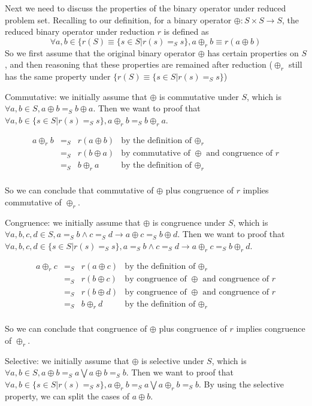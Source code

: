 \documentclass[a4paper,12pt,twoside,openright]{report}
\newcommand{\e}[2]{
\begin{equation}
  \label{#1} 
  #2
\end{equation}
}
\begin{document}
Next we need to discuss the properties of the binary operator under reduced problem set. 
Recalling to our definition, for a binary operator $\oplus : S \times S \rightarrow S$, the reduced binary operator under reduction $r$ is defined as \[\forall a, b \in \{r(S) \equiv \{s \in S | r(s) =_S s\}, a \oplus_r b \equiv r(a \oplus b)\]
So we first assume that the original binary operator $\oplus$ has certain properties on $S$, and then reasoning that these properties are remained after reduction ($\oplus_r$ still has the same property under $\{r(S) \equiv \{s \in S | r(s) =_S s\}$)

Commutative: we initially assume that $\oplus$ is commutative under $S$, which is $\forall a,b \in S, a \oplus b =_S b \oplus a$. Then we want to proof that $\forall a,b \in \{s \in S | r(s) =_S s\}, a \oplus_r b =_S b \oplus_r a$.
\e{r:proof:commutative}{
\begin{array}{rcll} 
a \oplus_r b & =_S & r(a \oplus b) &\mbox{by the definition of $\oplus_r$} \\
			 & =_S & r(b \oplus a) &\mbox{by commutative of $\oplus$ and congruence of $r$}\\
             & =_S & b \oplus_r a &\mbox{by the definition of $\oplus_r$} \\
\end{array}}
So we can conclude that commutative of $\oplus$ plus congruence of $r$ implies commutative of $\oplus_r$.

Congruence: we initially assume that $\oplus$ is congruence under $S$, which is $\forall a,b,c,d \in S, a =_S b \wedge c =_S d \rightarrow a \oplus c =_S b \oplus d$. Then we want to proof that $\forall a,b,c,d \in \{s \in S | r(s) =_S s\}, a =_S b \wedge c =_S d \rightarrow a \oplus_r c =_S b \oplus_r d$.
\e{r:proof:congruence}{
\begin{array}{rcll} 
a \oplus_r c & =_S & r(a \oplus c) &\mbox{by the definition of $\oplus_r$} \\
			 & =_S & r(b \oplus c) &\mbox{by congruence of $\oplus$ and congruence of $r$}\\
			 & =_S & r(b \oplus d) &\mbox{by congruence of $\oplus$ and congruence of $r$}\\
             & =_S & b \oplus_r d &\mbox{by the definition of $\oplus_r$} \\
\end{array}}
So we can conclude that congruence of $\oplus$ plus congruence of $r$ implies congruence of $\oplus_r$.

Selective: we initially assume that $\oplus$ is selective under $S$, which is $\forall a,b \in S, a \oplus b =_S a \bigvee a \oplus b =_S b$. Then we want to proof that $\forall a,b \in \{s \in S | r(s) =_S s\}, a \oplus_r b =_S a \bigvee a \oplus_r b =_S b$. By using the selective property, we can split the cases of $a\oplus b$.
\end{document}
